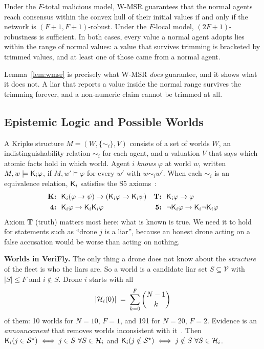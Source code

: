 \begin{lemma}
\label{lem:wmsr}
Under the $F$-total malicious model, W-MSR guarantees that the normal agents reach consensus within the convex hull of
their initial values if and only if the network is $(F+1,F+1)$-robust. Under the $F$-local model, $(2F+1)$-robustness
is sufficient. In both cases, every value a normal agent adopts lies within the range of normal values: a value that
survives trimming is bracketed by trimmed values, and at least one of those came from a normal agent.
\end{lemma}

Lemma~\ref{lem:wmsr} is precisely what W-MSR \emph{does} guarantee, and it shows what it does not. A liar that reports a
value inside the normal range survives the trimming forever, and a non-numeric claim cannot be trimmed at all.

\subsection{Epistemic Logic and Possible Worlds}
\label{sec:prelim-epistemic}

A Kripke structure $M=(W,\{\sim_i\},V)$ consists of a set of worlds $W$, an indistinguishability relation $\sim_i$ for
each agent, and a valuation $V$ that says which atomic facts hold in which world. Agent $i$ \emph{knows} $\varphi$ at
world $w$, written $M,w\models\mathsf{K}_i\varphi$, if $M,w'\models\varphi$ for every $w'$ with $w\sim_i w'$. When each
$\sim_i$ is an equivalence relation, $\mathsf{K}_i$ satisfies the S5 axioms~\citep{Fagin1995}:
\begin{align}
    \textbf{K:}&\ \ \Kn_i(\varphi\rightarrow\psi)\rightarrow(\Kn_i\varphi\rightarrow\Kn_i\psi) &
    \textbf{T:}&\ \ \Kn_i\varphi\rightarrow\varphi \\
    \textbf{4:}&\ \ \Kn_i\varphi\rightarrow\Kn_i\Kn_i\varphi &
    \textbf{5:}&\ \ \neg\Kn_i\varphi\rightarrow\Kn_i\neg\Kn_i\varphi
\end{align}
Axiom \textbf{T} (truth) matters most here: what is known is true. We need it to hold for statements such as ``drone
$j$ is a liar'', because an honest drone acting on a false accusation would be worse than acting on nothing.

\textbf{Worlds in VeriFly.} The only thing a drone does not know about the \emph{structure} of the fleet is who the liars are.
So a world is a candidate liar set $S\subseteq\mathcal{V}$ with $|S|\le F$ and $i\notin S$. Drone $i$ starts with all
\begin{equation}
    |\mathcal{H}_i(0)| \;=\; \sum_{k=0}^{F}\binom{N-1}{k}
    \label{eq:nworlds}
\end{equation}
of them: 10 worlds for $N=10$, $F=1$, and 191 for $N=20$, $F=2$. Evidence is an \emph{announcement} that removes worlds
inconsistent with it~\citep{vanDitmarsch2007}. Then
$\Kn_i(j\in\mathcal{S}^\star)\iff j\in S\ \forall S\in\Hyp_i$ and
$\Kn_i(j\notin\mathcal{S}^\star)\iff j\notin S\ \forall S\in\Hyp_i$.

